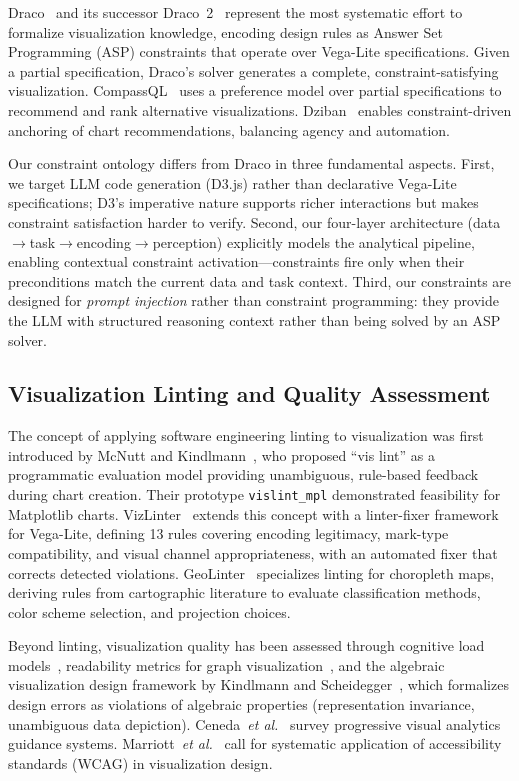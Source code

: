 \documentclass[final,5p,times,twocolumn]{elsarticle}
\newcommand{\etal}{\textit{et al.}}
\begin{document}
Draco~\cite{moritz2018formalizing} and its successor Draco~2~\cite{zeng2023draco2} represent the most systematic effort to formalize visualization knowledge, encoding design rules as Answer Set Programming (ASP) constraints that operate over Vega-Lite specifications. Given a partial specification, Draco's solver generates a complete, constraint-satisfying visualization. CompassQL~\cite{wongsuphasawat2016towards} uses a preference model over partial specifications to recommend and rank alternative visualizations. Dziban~\cite{lin2020dziban} enables constraint-driven anchoring of chart recommendations, balancing agency and automation.

Our constraint ontology differs from Draco in three fundamental aspects. First, we target LLM code generation (D3.js) rather than declarative Vega-Lite specifications; D3's imperative nature supports richer interactions but makes constraint satisfaction harder to verify. Second, our four-layer architecture (data$\to$task$\to$encoding$\to$perception) explicitly models the analytical pipeline, enabling contextual constraint activation---constraints fire only when their preconditions match the current data and task context. Third, our constraints are designed for \textit{prompt injection} rather than constraint programming: they provide the LLM with structured reasoning context rather than being solved by an ASP solver.

\subsection{Visualization Linting and Quality Assessment}

The concept of applying software engineering linting to visualization was first introduced by McNutt and Kindlmann~\cite{mcnutt2018vislint}, who proposed ``vis lint'' as a programmatic evaluation model providing unambiguous, rule-based feedback during chart creation. Their prototype \texttt{vislint\_mpl} demonstrated feasibility for Matplotlib charts. VizLinter~\cite{chen2022vizlinter} extends this concept with a linter-fixer framework for Vega-Lite, defining 13 rules covering encoding legitimacy, mark-type compatibility, and visual channel appropriateness, with an automated fixer that corrects detected violations. GeoLinter~\cite{lei2024geolinter} specializes linting for choropleth maps, deriving rules from cartographic literature to evaluate classification methods, color scheme selection, and projection choices.

Beyond linting, visualization quality has been assessed through cognitive load models~\cite{huang2009measuring}, readability metrics for graph visualization~\cite{burch2011evaluation}, and the algebraic visualization design framework by Kindlmann and Scheidegger~\cite{kindlmann2014algebraic}, which formalizes design errors as violations of algebraic properties (representation invariance, unambiguous data depiction). Ceneda~\etal{}~\cite{ceneda2019guide} survey progressive visual analytics guidance systems. Marriott~\etal{}~\cite{marriott2021inclusive} call for systematic application of accessibility standards (WCAG) in visualization design.
\end{document}
